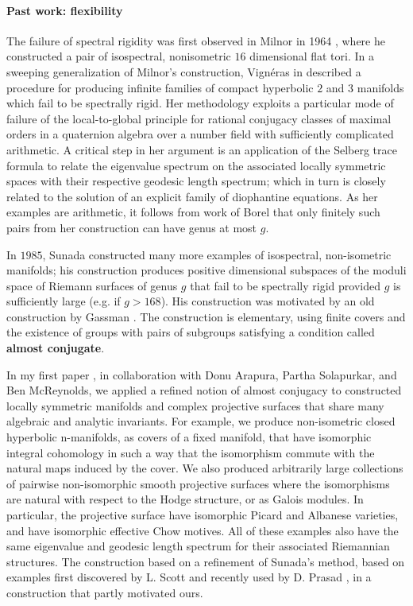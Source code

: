 \documentclass[11pt]{article}
\begin{document}
	\paragraph{Past work: flexibility} The failure of spectral rigidity was first observed in Milnor in 1964 \cite{milnor1964}, where he constructed a pair of isospectral, nonisometric $16$ dimensional flat tori. In a sweeping generalization of Milnor's construction,  Vignéras in \cite{vigneras1980}  described a procedure for producing infinite families of compact hyperbolic $2$ and $3$  manifolds which fail to be spectrally rigid. Her methodology  exploits  a  particular mode of failure of the local-to-global principle for rational conjugacy classes of maximal orders in a quaternion algebra over a number field with sufficiently complicated arithmetic.  A critical step in her argument is an application of the Selberg trace formula to relate the eigenvalue spectrum on the associated locally symmetric spaces with their respective geodesic length spectrum; which in turn is closely related to the solution of an explicit family of diophantine equations.  As her examples are arithmetic, it follows from work of Borel \cite{borel1989} that only finitely such pairs from her construction can have genus at most $g$.
	
	In $1985$, Sunada \cite{sunada1985}  constructed many more examples of isospectral, non-isometric manifolds; his construction produces positive dimensional subspaces of the moduli space of Riemann surfaces of genus $g$ that fail to be spectrally rigid provided $g$ is sufficiently large (e.g. if $g > 168$). His construction was motivated by an old construction by Gassman \cite{gassmann1926}. The
	construction is elementary, using finite covers and the existence of groups with pairs of subgroups satisfying a condition called {\bf almost conjugate}. 
	
	In my first paper \cite{arapura2019} , in collaboration with Donu Arapura, Partha Solapurkar, and Ben McReynolds, we applied a refined notion of almost conjugacy to  constructed locally symmetric manifolds and complex projective surfaces that share many algebraic and analytic invariants. For example, we produce non-isometric closed hyperbolic n-manifolds, as covers of a fixed manifold, that have isomorphic integral cohomology in such a way that the isomorphism commute with the natural maps induced by the cover. We also produced arbitrarily large collections of pairwise non-isomorphic smooth projective surfaces where the isomorphisms are natural with respect to the Hodge structure, or as Galois modules. In particular, the projective surface have isomorphic Picard and Albanese varieties, and have isomorphic effective Chow motives. All of these examples also have the same eigenvalue and geodesic length spectrum for their associated Riemannian structures. The construction based on a refinement of Sunada's method, based on examples first discovered by L. Scott \cite{scott1993integral}   and recently used by D. Prasad \cite{prasad2017}, in a construction that partly motivated ours.
	
\end{document}
